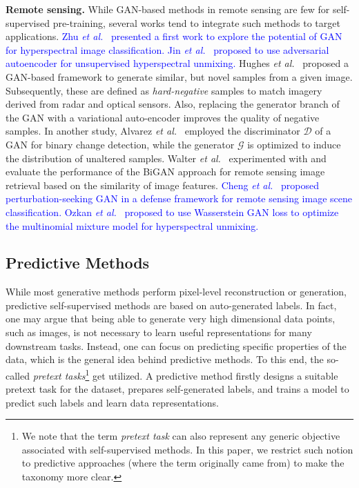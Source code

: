 \documentclass[lettersize,journal]{IEEEtran}
\newcommand{\etal}{\textit{et al.}}
\begin{document}
\textbf{Remote sensing.} While GAN-based methods in remote sensing are few for self-supervised pre-training, several works tend to integrate such methods to target applications.
\textcolor{blue}{Zhu \etal~\cite{zhu2018generative} presented a first work to explore the potential of GAN for hyperspectral image classification. Jin \etal~\cite{jin2021adversarial} proposed to use adversarial autoencoder for unsupervised hyperspectral unmixing.} 
Hughes \etal~\cite{hughes2018mining} proposed a GAN-based framework to generate similar, but novel samples from a given image. Subsequently, these are defined as \textit{hard-negative} samples to match imagery derived from radar and optical sensors. Also, replacing the generator branch of the GAN with a variational auto-encoder improves the quality of negative samples. In another study, Alvarez \etal~\cite{alvarez2020s2} employed the discriminator $\mathcal{D}$ of a GAN for binary change detection, while the generator $\mathcal{G}$ is optimized to induce the distribution of unaltered samples. Walter \etal~\cite{walter2020self} experimented with and evaluate the performance of the BiGAN approach for remote sensing image retrieval based on the similarity of image features. 
\textcolor{blue}{Cheng \etal~\cite{cheng2021perturbation} proposed perturbation-seeking GAN in a defense framework for remote sensing image scene classification. Ozkan \etal~\cite{ozkan2020spectral} proposed to use Wasserstein GAN loss to optimize the multinomial mixture
model for hyperspectral unmixing.}


\subsection{Predictive Methods}

While most generative methods perform pixel-level reconstruction or generation, predictive self-supervised methods are based on auto-generated labels. In fact, one may argue that being able to generate very high dimensional data points, such as images, is not necessary to learn useful representations for many downstream tasks. Instead, one can focus on predicting specific properties of the data, which is the general idea behind predictive methods. To this end, the so-called \textit{pretext tasks}\footnote{We note that the term \textit{pretext task} can also represent any generic objective associated with self-supervised methods. In this paper, we restrict such notion to predictive approaches (where the term originally came from) to make the taxonomy more clear.} get utilized. A predictive method firstly designs a suitable pretext task for the dataset, prepares self-generated labels, and trains a model to predict such labels and learn data representations.
\end{document}

